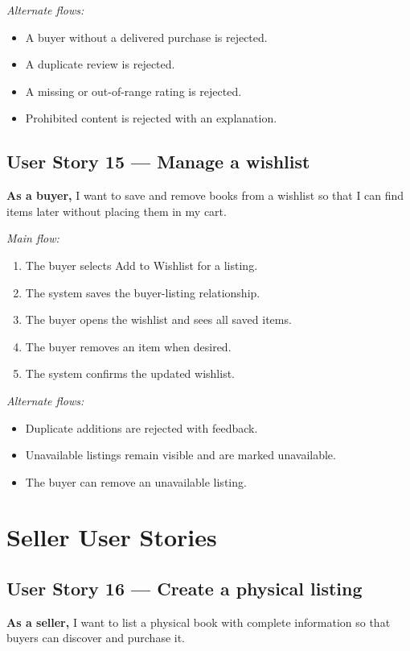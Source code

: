 \documentclass[11pt]{scrreprt}
\begin{document}
\textit{Alternate flows:}
\begin{itemize}
\item A buyer without a delivered purchase is rejected.
\item A duplicate review is rejected.
\item A missing or out-of-range rating is rejected.
\item Prohibited content is rejected with an explanation.
\end{itemize}

\subsection{User Story 15 --- Manage a wishlist}
\textbf{As a buyer,} I want to save and remove books from a wishlist so that I
can find items later without placing them in my cart.

\textit{Main flow:}
\begin{enumerate}
\item The buyer selects Add to Wishlist for a listing.
\item The system saves the buyer-listing relationship.
\item The buyer opens the wishlist and sees all saved items.
\item The buyer removes an item when desired.
\item The system confirms the updated wishlist.
\end{enumerate}

\textit{Alternate flows:}
\begin{itemize}
\item Duplicate additions are rejected with feedback.
\item Unavailable listings remain visible and are marked unavailable.
\item The buyer can remove an unavailable listing.
\end{itemize}

\section{Seller User Stories}

\subsection{User Story 16 --- Create a physical listing}
\textbf{As a seller,} I want to list a physical book with complete information
so that buyers can discover and purchase it.
\end{document}
